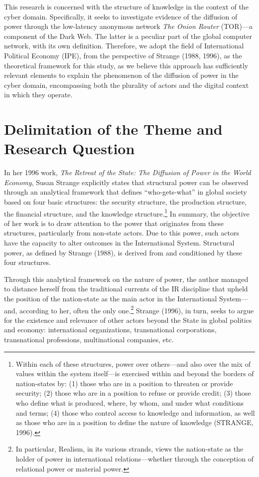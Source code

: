 This research is concerned with the structure of knowledge in the context of the cyber domain. Specifically, it seeks to investigate evidence of the diffusion of power through the low-latency anonymous network \textit{The Onion Router} (TOR)—a component of the Dark Web. The latter is a peculiar part of the global computer network, with its own definition. Therefore, we adopt the field of International Political Economy (IPE), from the perspective of Strange (1988, 1996), as the theoretical framework for this study, as we believe this approach has sufficiently relevant elements to explain the phenomenon of the diffusion of power in the cyber domain, encompassing both the plurality of actors and the digital context in which they operate.

\section{Delimitation of the Theme and Research Question}

In her 1996 work, \textit{The Retreat of the State: The Diffusion of Power in the World Economy}, Susan Strange explicitly states that structural power can be observed through an analytical framework that defines “who-gets-what” in global society based on four basic structures: the security structure, the production structure, the financial structure, and the knowledge structure.\footnote{Within each of these structures, power over others—and also over the mix of values within the system itself—is exercised within and beyond the borders of nation-states by: (1) those who are in a position to threaten or provide security; (2) those who are in a position to refuse or provide credit; (3) those who define what is produced, where, by whom, and under what conditions and terms; (4) those who control access to knowledge and information, as well as those who are in a position to define the nature of knowledge (STRANGE, 1996).} In summary, the objective of her work is to draw attention to the power that originates from these structures, particularly from non-state actors. Due to this power, such actors have the capacity to alter outcomes in the International System. Structural power, as defined by Strange (1988), is derived from and conditioned by these four structures.

Through this analytical framework on the nature of power, the author managed to distance herself from the traditional currents of the IR discipline that upheld the position of the nation-state as the main actor in the International System—and, according to her, often the only one.\footnote{In particular, Realism, in its various strands, views the nation-state as the holder of power in international relations—whether through the conception of relational power or material power.} Strange (1996), in turn, seeks to argue for the existence and relevance of other actors beyond the State in global politics and economy: international organizations, transnational corporations, transnational professions, multinational companies, etc.

